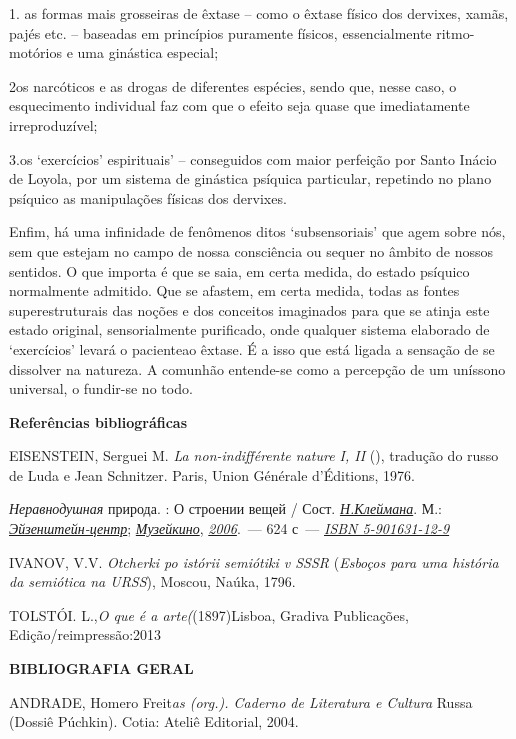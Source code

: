 1. as formas mais grosseiras de êxtase -- como o êxtase físico dos
dervixes, xamãs, pajés etc. -- baseadas em princípios puramente físicos,
essencialmente ritmo-motórios e uma ginástica especial;

2os narcóticos e as drogas de diferentes espécies, sendo que, nesse
caso, o esquecimento individual faz com que o efeito seja quase que
imediatamente irreproduzível;

3.os `exercícios' espirituais' -- conseguidos com maior perfeição por
Santo Inácio de Loyola, por um sistema de ginástica psíquica particular,
repetindo no plano psíquico as manipulações físicas dos dervixes.

Enfim, há uma infinidade de fenômenos ditos `subsensoriais' que agem
sobre nós, sem que estejam no campo de nossa consciência ou sequer no
âmbito de nossos sentidos. O que importa é que se saia, em certa medida,
do estado psíquico normalmente admitido. Que se afastem, em certa
medida, todas as fontes superestruturais das noções e dos conceitos
imaginados para que se atinja este estado original, sensorialmente
purificado, onde qualquer sistema elaborado de `exercícios' levará o
pacienteao êxtase. É a isso que está ligada a sensação de se dissolver
na natureza. A comunhão entende-se como a percepção de um uníssono
universal, o fundir-se no todo.

\textbf{Referências bibliográficas}

EISENSTEIN, Serguei M. \emph{La non-indifférente nature I, II} (),
tradução do russo de Luda e Jean Schnitzer. Paris, Union Générale
d'Éditions, 1976.

\emph{Неравнодушная} природа. : О строении вещей / Сост.
\href{https://ru.wikipedia.org/wiki/Клейман,_Наум_Ихильевич}{\emph{\emph{Н.Клеймана}}}.
М.:
\href{https://ru.wikipedia.org/w/index.php?title=Эйзенштейн-центр\&action=edit\&redlink=1}{\emph{Эйзенштейн-центр}};
\href{https://ru.wikipedia.org/wiki/Музей_кино}{\emph{Музейкино}},
\href{https://ru.wikipedia.org/wiki/2006}{\emph{2006}}.~--- 624 с~---
\href{https://ru.wikipedia.org/wiki/Служебная:Источники_книг/5901631129}{\emph{ISBN
5-901631-12-9}}

IVANOV, V.V. \emph{Otcherki po istórii semiótiki v SSSR} (\emph{Esboços
para uma história da semiótica na URSS}), Moscou, Naúka, 1796.

TOLSTÓI. L.,\emph{O que é a arte(}(1897)Lisboa, Gradiva Publicações,
Edição/reimpressão:2013

\textbf{BIBLIOGRAFIA GERAL}

ANDRADE, Homero Freit\emph{as (org.). Caderno de Literatura e Cultura}
Russa (Dossiê Púchkin). Cotia: Ateliê Editorial, 2004.

